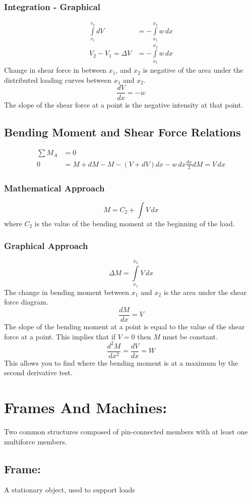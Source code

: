 \documentclass[14pt]{article}
\begin{document}
    \subsubsection{Integration - Graphical}
    \begin{align*}
        \int \limits_{v_1}^{v_2}dV&=-\int\limits_{x_1}^{x_2}w\, dx\\
        V_2-V_1=\Delta V&=-\int \limits_{x_1}^{x_2} w\, dx 
    \end{align*}
    Change in shear force in between $x_1$, and $x_2$ is negative of the
    area under the distributed loading curves between $x_1$ and $x_2$.
    $$\frac{dV}{dx}=-w$$ The slope of the shear force at a point is the
    negative intensity at that point.
    \subsection{Bending Moment and Shear Force Relations}
    \begin{align*}
        \sum M_A&=0\\
        0&=M+dM-M-(V+dV)dx-w\, dx\frac{dx}{2}
        dM=V\,dx
    \end{align*}
    \subsubsection{Mathematical Approach}
    $$M=C_2+\int V\, dx$$ where $C_2$ is the value of the bending moment
    at the beginning of the load.
    \subsubsection{Graphical Approach}
    $$\Delta M=\int \limits_{x_1}^{x_2}V\, dx$$ The change in bending
    moment between $x_1$ and $x_2$ is the area under the shear force
    diagram.
    $$\frac{dM}{dx}=V$$ The slope of the bending moment at a point is
    equal to the value of the shear force at a point. This implies that
    if $V=0$ then $M$ must be constant.
    $$\frac{d^2M}{dx^2}=\frac{dV}{dx}=W$$ This allows you to find where
    the bending moment is at a maximum by the second derivative test.
    \section{Frames And Machines: }
    Two common structures composed of pin-connected members with at
    least one multiforce members.
    \subsection{Frame:}
    A stationary object, used to support loads
\end{document}
